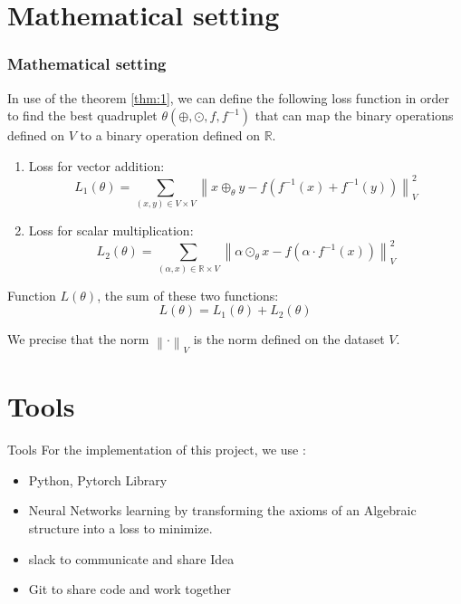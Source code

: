 \documentclass{beamer}
\begin{document}
    \section{Mathematical setting}
    \begin{frame}
        \frametitle{Mathematical setting}
        In use of the theorem \ref{thm:1}, we can define the following loss function in order to find the best  quadruplet ${\theta}(\oplus,\odot,f,f^{-1})$ that can map the binary operations defined on $V$ to a binary operation defined on $\mathbb{R}$.


        \begin{enumerate}
            \item Loss for vector addition:
            \[
                L_1(\theta) = \sum_{(x, y) \in V \times V} \left\lVert x \oplus_{\theta} y - f(f^{-1}(x) + f^{-1}(y))\right\rVert_{V}^2
            \]
            \item Loss for scalar multiplication:
            \[
                L_2(\theta) = \sum_{(\alpha, x) \in \mathbb{R} \times V} \left\lVert \alpha \odot_{\theta} x - f(\alpha \cdot f^{-1}(x)) \right\rVert_{V}^2
            \]
        \end{enumerate}
    
        Function $L(\theta)$, the sum of these two functions:
        \[
        L(\theta) = L_1(\theta) + L_2(\theta)
        \]
    
        We  precise that the norm $\left\lVert \cdot \right\rVert_{V}$ is the norm defined on the dataset $V$.
    \end{frame}


    
    \section{Tools}
    \begin{frame}{Tools}
        For the implementation of this project, we use :
        \begin{itemize}
            \item Python, Pytorch Library 
            \item Neural Networks learning by transforming the axioms of
            an Algebraic structure into a loss to minimize.
            \item slack to communicate and share Idea
            \item Git to share code and work together
        \end{itemize}
    \end{frame}
    
\end{document}
